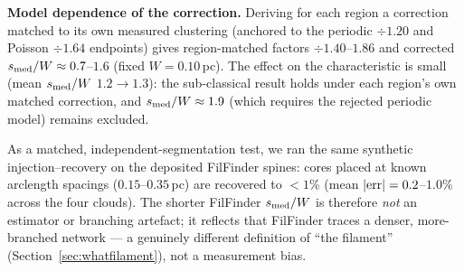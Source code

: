 \documentclass[usenatbib,twoside,twocolumn]{mnras}
\begin{document}
\smallskip\noindent\textbf{Model dependence of the correction.}\label{sec:injection_recovery_model}
Deriving for each region a correction matched to its own measured clustering (anchored to the periodic $\div1.20$ and Poisson $\div1.64$ endpoints) gives region-matched factors $\div1.40$--$1.86$ and corrected $s_{\rm med}/W\approx0.7$--$1.6$ (fixed $W=0.10$\,pc). The effect on the characteristic is small (mean $s_{\rm med}/W$ $1.2\to1.3$): the sub-classical result holds under each region's own matched correction, and $s_{\rm med}/W\approx1.9$ (which requires the rejected periodic model) remains excluded.

As a matched, independent-segmentation test, we ran the same synthetic injection--recovery on the deposited FilFinder spines: cores placed at known arclength spacings ($0.15$--$0.35$\,pc) are recovered to $<1\%$ (mean $|{\rm err}|=0.2$--$1.0\%$ across the four clouds). The shorter FilFinder $s_{\rm med}/W$ is therefore \emph{not} an estimator or branching artefact; it reflects that FilFinder traces a denser, more-branched network --- a genuinely different definition of ``the filament'' (Section~\ref{sec:whatfilament}), not a measurement bias.
\end{document}

